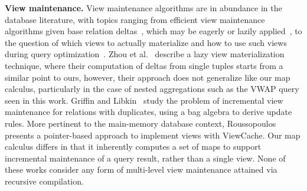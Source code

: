 \textbf{View maintenance.}
View maintenance algorithms are in abundance in the database literature, with
topics ranging from efficient view maintenance algorithms given base relation
deltas~\cite{colby-sigmod:96}, which may be eagerly or lazily
applied~\cite{yan-vldb:95,zhou-vldb:07}, to the question of which views to
actually materialize and how to use such views during query
optimization~\cite{kotidis-tods:01,zhou-icde:07}.
Zhou et al.~\cite{zhou-vldb:07} describe a lazy view materialization technique,
where their computation of deltas from single tuples starts from a similar point
to ours, however, their approach does not generalize like our map calculus,
particularly in the case of nested aggregations such as the VWAP query seen in
this work.
Griffin and Libkin~\cite{griffin-sigmod:95} study the problem of incremental
view maintenance for relations with duplicates, using a bag algebra to derive
update rules.  
More pertinent to the main-memory database context,
Roussopoulos~\cite{roussopoulos-tods:91} presents a pointer-based approach to
implement views with ViewCache.
Our map calculus differs in that it inherently computes a set of maps to support
incremental maintenance of a query result, rather than a single view. None of
these works consider any form of multi-level view maintenance attained via
recursive compilation.

